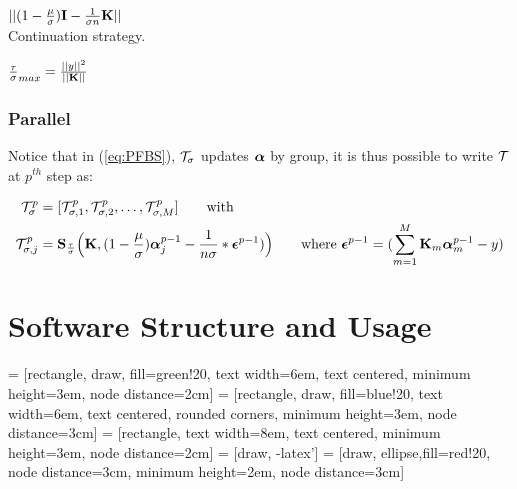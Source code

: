 \documentclass[tablecaption=bottom,wcp]{jmlr} %
\begin{document}
$||(1 - \frac{\mu}{\sigma}){\bf I} - \frac{1}{\sigma n} {\bf K} ||$\\

Continuation strategy.

$\frac{\tau}{\sigma}_{max} = \frac{||y||^2}{||{\bf K}||}$

\subsubsection{Parallel}

Notice that in (\ref{eq:PFBS}), ${\cal T}_\sigma$ updates $\boldsymbol{\alpha}$ by group, it is thus possible to write ${\cal T}$ at $p^{th}$ step as:

\begin{align*}
{\cal T}^p_\sigma &= [{\cal T}^p_{\sigma, 1}, {\cal T}^p_{\sigma, 2}, \dots, {\cal T}^p_{\sigma, M}] \qquad \mbox{with}\\
{\cal T}^p_{\sigma, j} &= 
\textbf{S}_{\frac{\tau}{\sigma}}
\Big({\bf K}, (1-\frac{\mu}{\sigma})\boldsymbol{\alpha}^{p-1}_j - 
\frac{1}{n \sigma} * \boldsymbol{\epsilon}^{p-1}  )
\Big) \qquad \mbox{where } 
\boldsymbol{\epsilon}^{p-1}= (\sum_{m=1}^M {\bf K}_m \boldsymbol{\alpha}^{p-1}_m - y)
\end{align*}

\begin{comment}
\subsubsection{Alternative Regularization through Early Stopping}
\citet{micchelli-convex-2005}
\end{comment}

\section{Software Structure and Usage}

 = [rectangle, draw, fill=green!20, 
    text width=6em, text centered, minimum height=3em, 
    node distance=2cm]
 = [rectangle, draw, fill=blue!20, 
    text width=6em, text centered, rounded corners, minimum height=3em, node distance=3cm]
 = [rectangle, 
    text width=8em, text centered, minimum height=3em,
    node distance=2cm]    
 = [draw, -latex']
 = [draw, ellipse,fill=red!20, node distance=3cm,
    minimum height=2em, node distance=3cm]
\end{document}
